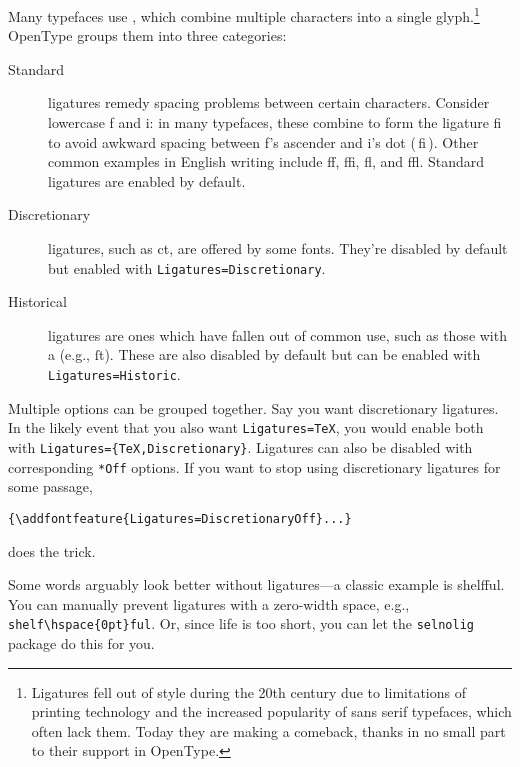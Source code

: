 Many typefaces use , which combine multiple characters
into a single glyph.\punckern\footnote{Ligatures fell out
of style during the 20{th}
century due to limitations of printing technology and the increased popularity
of sans serif typefaces, which often lack them.
Today they are making a comeback,
thanks in no small part to their support in OpenType.}
OpenType groups them into three categories:
\begin{description}
\item[Standard] ligatures remedy spacing problems between certain characters.
    Consider lowercase f and i: in many typefaces,
    these combine to form the ligature fi to avoid
    awkward spacing between f's ascender and i's dot
    { (\,fi\,)}.
    Other common examples in English writing include ff,
    ffi, fl, and ffl.
    Standard ligatures are enabled by default.
\item[Discretionary] ligatures, such as
    {ct},
    are offered by some fonts.
    They're disabled by default but enabled with
    \verb|Ligatures=Discretionary|.
\item[Historical] ligatures are ones which have fallen out of common use,
    such as those with a  (e.g., ſt).
    These are also disabled by default
    but can be enabled with \verb|Ligatures=Historic|.
\end{description}
Multiple options can be grouped together.
Say you want discretionary ligatures.
In the likely event that you also want \verb|Ligatures=TeX|,
you would enable both with
\verb|Ligatures={TeX,Discretionary}|.
Ligatures can also be disabled with corresponding \verb|*Off|
options. If you want to stop using discretionary ligatures for some passage,
\begin{leftfigure}
\begin{lstlisting}
{\addfontfeature{Ligatures=DiscretionaryOff}...}
\end{lstlisting}
\end{leftfigure}
does the trick.

Some words arguably look better without ligatures---a classic example
is shelfful.\punckern{}
You can manually prevent ligatures with a zero-width
space, e.g., \verb|shelf\hspace{0pt}ful|.
Or, since life is too short, you can let the \texttt{selnolig} package
do this for you.

